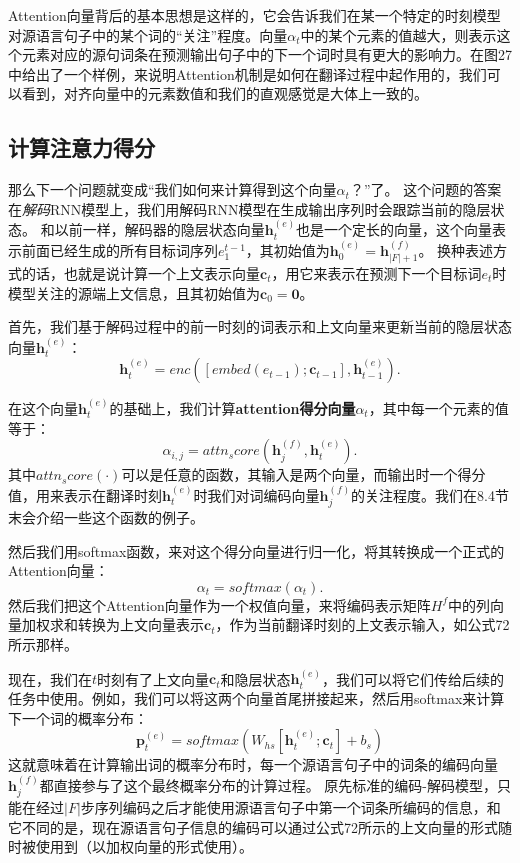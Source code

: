 \documentclass[10pt,a4paper]{ctexart}
\begin{document}
Attention向量背后的基本思想是这样的，它会告诉我们在某一个特定的时刻模型对源语言句子中的某个词的“关注”程度。向量$\textbf{$\alpha$}_t$中的某个元素的值越大，则表示这个元素对应的源句词条在预测输出句子中的下一个词时具有更大的影响力。在图27中给出了一个样例，来说明Attention机制是如何在翻译过程中起作用的，我们可以看到，对齐向量中的元素数值和我们的直观感觉是大体上一致的。

\subsection{计算注意力得分}
那么下一个问题就变成“我们如何来计算得到这个向量$\textbf{$\alpha$}_t$？”了。
这个问题的答案在\textit{解码}RNN模型上，我们用解码RNN模型在生成输出序列时会跟踪当前的隐层状态。
和以前一样，解码器的隐层状态向量$\textbf{h}_t^{(e)}$也是一个定长的向量，这个向量表示前面已经生成的所有目标词序列$e_1^{t-1}$，其初始值为$\textbf{h}_0^{(e)} = \textbf{h}_{|F|+1}^{(f)}$。
换种表述方式的话，也就是说计算一个上文表示向量$\textbf{c}_t$，用它来表示在预测下一个目标词$e_t$时模型关注的源端上文信息，且其初始值为$\textbf{c}_0 = \textbf{0}$。

首先，我们基于解码过程中的前一时刻的词表示和上文向量来更新当前的隐层状态向量$\textbf{h}_t^{(e)}$：
\[
 \textbf{h}_t^{(e)} = enc([embed(e_{t-1});\textbf{c}_{t-1}],\textbf{h}_{t-1}^{(e)}).
\]

在这个向量$\textbf{h}_t^{(e)}$的基础上，我们计算\textbf{attention得分向量}$\textbf{$\alpha$}_t$，其中每一个元素的值等于：
\[
 \alpha_{i,j} = attn_score(\textbf{h}_j^{(f)},\textbf{h}_t^{(e)}).
\]
其中$attn_score(\cdot)$可以是任意的函数，其输入是两个向量，而输出时一个得分值，用来表示在翻译时刻$\textbf{h}_t^{(e)}$时我们对词编码向量$\textbf{h}_j^{(f)}$的关注程度。我们在8.4节末会介绍一些这个函数的例子。

然后我们用softmax函数，来对这个得分向量进行归一化，将其转换成一个正式的Attention向量：
\[
 \textbf{$\alpha$}_t = softmax(\textbf{$\alpha$}_t).
\]
然后我们把这个Attention向量作为一个权值向量，来将编码表示矩阵$H^{f}$中的列向量加权求和转换为上文向量表示$\textbf{c}_t$，作为当前翻译时刻的上文表示输入，如公式72所示那样。

现在，我们在$t$时刻有了上文向量$\textbf{c}_t$和隐层状态$\textbf{h}_t^{(e)}$，我们可以将它们传给后续的任务中使用。例如，我们可以将这两个向量首尾拼接起来，然后用softmax来计算下一个词的概率分布：
\[
 \textbf{p}_t^{(e)} = softmax(W_{hs}[\textbf{h}_t^{(e)};\textbf{c}_t] + b_s)
\]
这就意味着在计算输出词的概率分布时，每一个源语言句子中的词条的编码向量$\textbf{h}_j^{(f)}$都直接参与了这个最终概率分布的计算过程。
原先标准的编码-解码模型，只能在经过$|F|$步序列编码之后才能使用源语言句子中第一个词条所编码的信息，和它不同的是，现在源语言句子信息的编码可以通过公式72所示的上文向量的形式随时被使用到（以加权向量的形式使用）。
\end{document}
